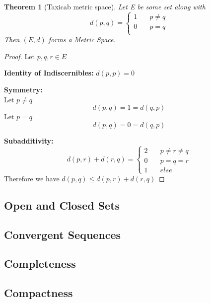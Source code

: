 \documentclass{article}
\newtheorem{theorem}{Theorem}[section]
\begin{document}
			\begin{theorem}[Taxicab metric space]
				\label{taxicab metric space}
				Let E be some set along with 
				\begin{equation*}
					d(p, q)=\begin{cases}
							  1 \quad & p \neq q \\
							  0 \quad & p = q \\
						 \end{cases}
					\end{equation*}
				Then $(E, d)$ forms a Metric Space.
				\end{theorem}
				\begin{proof}
					Let $p, q, r \in E$ 
					\item \textbf{Identity of Indiscernibles:} $d(p, p) = 0$
					\item \textbf{Symmetry:} \\
						Let $p \neq q$
						$$d(p, q) = 1 = d(q, p)$$
						Let $p=q$
						$$d(p, q) = 0 = d(q, p)$$
					\item \textbf{Subadditivity:}
						\begin{equation*}
							d(p, r) + d(r, q)=\begin{cases}
									2 \quad & p \neq r \neq q \\
									0 \quad & p = q = r \\
									1 \quad &else
								\end{cases}
						\end{equation*}
						Therefore we have $d(p, q) \leq d(p, r) + d(r, q)$

				\end{proof}
		\subsection{Open and Closed Sets}
		
		\subsection{Convergent Sequences}
		
		\subsection{Completeness}
		
		\subsection{Compactness}
		
\end{document}
